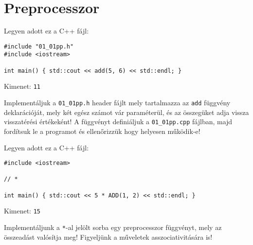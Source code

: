 \documentclass[../exercise_book/exercise_book.tex]{subfiles}
\begin{document}
	\section{Preprocesszor}
	\begin{exercise}
		Legyen adott ez a C++ fájl:
		
		\smallskip
		\begin{lstlisting}
#include "01_01pp.h"
#include <iostream>

int main() { std::cout << add(5, 6) << std::endl; }
		\end{lstlisting}
		Kimenet: \texttt{11}
		
		\smallskip
		Implementáljuk a \texttt{01\_01pp.h} header fájlt mely tartalmazza az \texttt{add} függvény deklarációját, mely két egész számot vár paraméterül, és az összegüket adja vissza visszatérési értékeként! A függvényt definiáljuk a \texttt{01\_01pp.cpp} fájlban, majd fordítsuk le a programot és ellenőrizzük hogy helyesen működik-e!
	\end{exercise}
	\begin{exercise}
		Legyen adott ez a C++ fájl:
		
		\smallskip
		\fbox{\textbf{01\_02pp\_main.cpp}}
		\begin{lstlisting}
#include <iostream>

// *

int main() { std::cout << 5 * ADD(1, 2) << std::endl; }
		\end{lstlisting}
		Kimenet: \texttt{15}
		
		\smallskip
		Implementáljunk a \texttt{*}-al jelölt sorba egy preprocesszor függvényt, mely az összeadást valósítja meg! Figyeljünk a műveletek asszociativitására is!
	\end{exercise}
\end{document}
